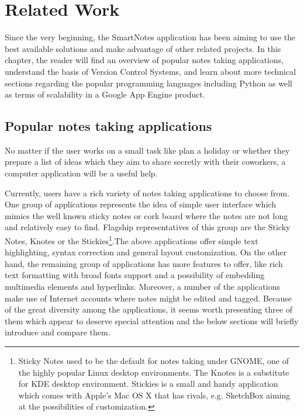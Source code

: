 \chapter{Related Work}\label{sec:related_work}
Since the very beginning, the SmartNotes application has been aiming to use the best available solutions and make advantage of other related projects. In this chapter, the reader will find an overview of popular notes taking applications, understand the basis of Version Control Systems, and learn about more technical sections regarding the popular programming languages including Python as well as terms of scalability in a Google App Engine product.

\section{Popular notes taking applications}\label{sec:popular_apps} 
No matter if the user works on a small task like plan a holiday or whether they prepare a list of ideas which they aim to share secretly with their coworkers, a computer application will be a useful help.     

Currently, users have a rich variety of notes taking applications to choose from. One group of applications represents the idea of simple user interface which mimics the well known sticky notes or cork board where the notes are not long and relatively easy to find. Flagship representatives of this group are the Sticky Notes, Knotes  or the Stickies\footnote{Sticky Notes used to be the default for notes taking under GNOME, one of the highly popular Linux desktop environments. The Knotes is a substitute for KDE desktop environment. Stickies is a small and handy application which comes with Apple's Mac OS X that has rivals, e.g. SketchBox aiming at the possibilities of customization.}.The above applications offer simple text highlighting, syntax correction and general layout customization. On the other hand, the remaining group of applications has more features to offer, like rich text formatting with broad fonts support and a possibility of embedding multimedia elements and hyperlinks. Moreover, a number of the applications make use of Internet accounts where notes might be edited and tagged. Because of the great diversity among the applications, it seems worth presenting three of them which appear to deserve special attention and the below sections will briefly introduce and compare them.

